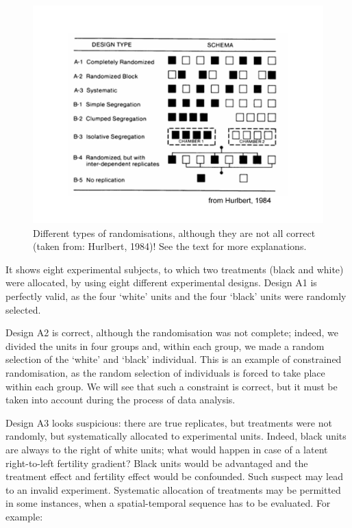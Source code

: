 \documentclass[a4paper,12pt,oneside]{book}
\begin{document}
\begin{figure}

{\centering \includegraphics[width=0.9\linewidth]{_images/Randomisation} 

}

\caption{Different types of randomisations, although they are not all correct (taken from: Hurlbert, 1984)! See the text for more explanations.}\label{fig:figName23}
\end{figure}

It shows eight experimental subjects, to which two treatments (black and white) were allocated, by using eight different experimental designs. Design A1 is perfectly valid, as the four `white' units and the four `black' units were randomly selected.

Design A2 is correct, although the randomisation was not complete; indeed, we divided the units in four groups and, within each group, we made a random selection of the `white' and `black' individual. This is an example of constrained randomisation, as the random selection of individuals is forced to take place within each group. We will see that such a constraint is correct, but it must be taken into account during the process of data analysis.

Design A3 looks suspicious: there are true replicates, but treatments were not randomly, but systematically allocated to experimental units. Indeed, black units are always to the right of white units; what would happen in case of a latent right-to-left fertility gradient? Black units would be advantaged and the treatment effect and fertility effect would be confounded. Such suspect may lead to an invalid experiment. Systematic allocation of treatments may be permitted in some instances, when a spatial-temporal sequence has to be evaluated. For example:
\end{document}
